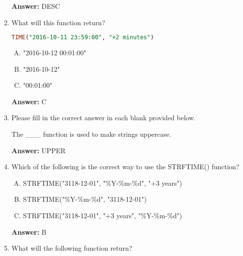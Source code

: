 \documentclass[12pt]{article}
\begin{document}
\begin{enumerate}[1.]
    \textbf{Answer:} DESC

    \item

    What will this function return?


    \bigskip

    \begin{lstlisting}[language=SQL]
    TIME("2016-10-11 23:59:00", "+2 minutes")
    \end{lstlisting}

    \bigskip

    \begin{enumerate}[A.]
        \item "2016-10-12 00:01:00"
        \item "2016-10-12"
        \item "00:01:00"
    \end{enumerate}

    \bigskip

    \textbf{Answer:} C

    \item

    Please fill in the correct answer in each blank provided below.

    \bigskip

    The \_\_\_  function is used to make strings uppercase.

    \bigskip

    \textbf{Answer:} UPPER

    \item

    Which of the following is the correct way to use the STRFTIME() function?

    \bigskip

    \begin{enumerate}[A.]
        \item STRFTIME("3118-12-01", "\%Y-\%m-\%d", "+3 years")
        \item STRFTIME("\%Y-\%m-\%d", "3118-12-01")
        \item STRFTIME("3118-12-01", "+3 years", "\%Y-\%m-\%d")

    \end{enumerate}

    \bigskip

    \textbf{Answer:} B

    \item

    What will the following function return?


\end{enumerate}
\end{document}

